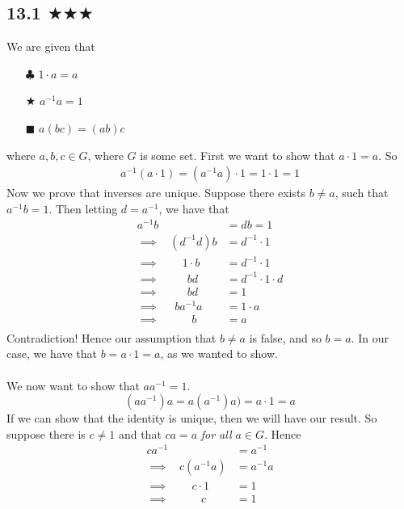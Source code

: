 

\subsection{13.1 $\bigstar\bigstar\bigstar$}

We are given that 
\begin{itemize}
\item[$\clubsuit$] $1\cdot a=a$
\item[$\bigstar$] $a^{-1}a=1$
\item[$\blacksquare$] $a(bc)=(ab)c$
\end{itemize}
where $a,b,c\in G$, where $G$ is some set. First we want to show that $a\cdot 1=a$. So
\begin{align*}
a^{-1}(a \cdot 1)=(a^{-1}a)\cdot 1=1\cdot 1=1
\end{align*}
Now we prove that inverses are unique. Suppose there exists $b\neq a$, such that $a^{-1}b=1$. Then letting $d=a^{-1}$, we have that
\begin{align*}
a^{-1}b&=db=1\\
\implies \ \ \ \ (d^{-1}d)b&=d^{-1}\cdot 1\\
\implies \ \ \ \ \ \ \ \ \  1\cdot b&=d^{-1}\cdot 1\\
\implies \ \ \ \ \ \ \ \ \ \ \  bd&=d^{-1}\cdot 1\cdot d\\
\implies \ \ \ \ \ \ \ \ \ \ \ bd&=1\\
\implies \ \ \ \ \ \ ba^{-1}a&=1\cdot a\\
\implies \ \ \ \ \ \, \ \ \ \ \ \ \  b&=a\\
\end{align*} 
Contradiction! Hence our assumption that $b\neq a$ is false, and so $b=a$. In our case, we have that $b=a\cdot 1=a$, as we wanted to show.\\ \\
We now want to show that $aa^{-1}=1$. 
$$(aa^{-1})a=a(a^{-1})a)=a\cdot 1 = a$$
If we can show that the identity is unique, then we will have our result. So suppose there is $c\neq 1$ and that $ca=a$ \emph{for all $a\in G$}. Hence
\begin{align*}
ca^{-1}&=a^{-1}\\
\implies \ \ \ \ c(a^{-1}a)&=a^{-1}a\\
\implies \ \ \ \ \ \ \ \ \ c\cdot 1&=1\\
\implies \ \ \ \ \ \ \ \ \ \ \, \ \ c&=1\\
\end{align*}
